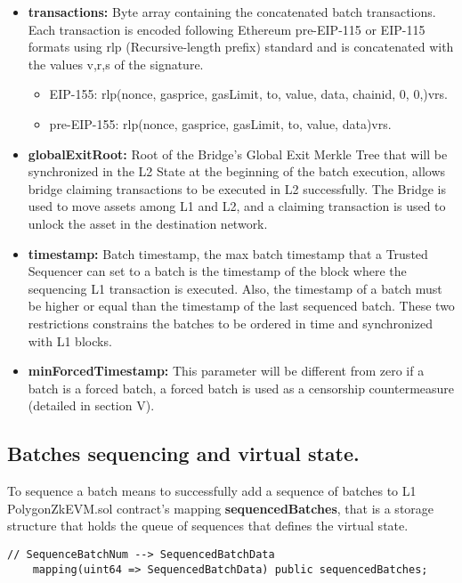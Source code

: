 \begin{itemize}
	\item \textbf{transactions:} Byte array containing the concatenated batch transactions. Each transaction is encoded following Ethereum pre-EIP-115 or EIP-115 formats using rlp (Recursive-length prefix) standard and is concatenated with the values v,r,s of the signature.
	\begin{itemize}
		\item EIP-155: rlp(nonce, gasprice, gasLimit, to, value, data, chainid, 0, 0,)vrs.
		\item pre-EIP-155: rlp(nonce, gasprice, gasLimit, to, value, data)vrs.
	\end{itemize}

	\item \textbf{globalExitRoot:} Root of the Bridge's Global Exit Merkle Tree that will be synchronized in the L2 State at the beginning of the batch execution, allows bridge claiming transactions to be executed in L2 successfully. The Bridge is used to move assets among L1 and L2, and a claiming transaction is used to unlock the asset in the destination network.
	\item \textbf{timestamp:} Batch timestamp, the max batch timestamp that a Trusted Sequencer can set to a batch is the timestamp of the block where the sequencing L1 transaction is executed. Also, the timestamp of a batch must be higher or equal than the timestamp of the last sequenced batch. These two restrictions constrains the batches to be ordered in time and synchronized  with L1 blocks. 
	\item \textbf{minForcedTimestamp:} This parameter will be different from zero if a batch is a forced batch, a forced batch is used as a censorship countermeasure (detailed in section V).
\end{itemize}


\subsection{Batches sequencing and virtual state.}

To sequence a batch means to successfully add a sequence of batches to L1 PolygonZkEVM.sol contract's mapping \textbf{sequencedBatches}, that is a storage structure that holds the queue of sequences that defines the virtual state.

\begin{lstlisting}[language=Solidity]
	// SequenceBatchNum --> SequencedBatchData
	mapping(uint64 => SequencedBatchData) public sequencedBatches;
\end{lstlisting}

